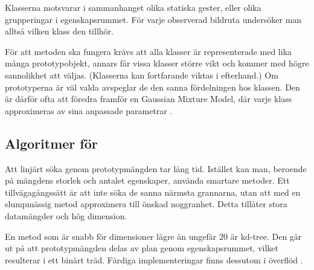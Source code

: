 \documentclass[../rapport_MVEX01-11-05]{subfiles}
\begin{document}
Klasserna motsvarar i sammanhanget olika statiska gester,
eller olika grupperingar i egenskapsrummet. För
varje observerad bildruta undersöker man alltså vilken klass den tillhör.

För att metoden ska fungera krävs att alla klasser är representerade med lika
många prototypobjekt, annars får vissa klasser större vikt och kommer med högre
sannolikhet att väljas. (Klasserna kan fortfarande viktas i efterhand.)
Om prototyperna är väl valda avspeglar de den sanna
fördelningen hos klassen.
Den är därför ofta att föredra framför en Gaussian Mixture Model, där
varje klass approximeras av sina anpassade parametrar \cite{Hastie09}.

\subsection{Algoritmer för \knn}
Att linjärt söka genom prototypmängden tar lång tid.
Istället kan man, beroende på mängdens storlek och antalet egenskaper,
använda smartare metoder.
Ett tillvägagångssätt är att inte söka de sanna närmsta grannarna,
utan att med en slumpmässig metod approximera till önskad noggranhet.
Detta tillåter stora datamängder och hög dimension.

En metod som är snabb för dimensioner lägre än ungefär 20 är kd-tree.
Den går ut på att prototypmängden delas av plan genom egenskapsrummet,
vilket resulterar i ett binärt träd. Färdiga implementeringar finns dessutom
i överflöd \cite{Skiena08}.

%

\end{document}
